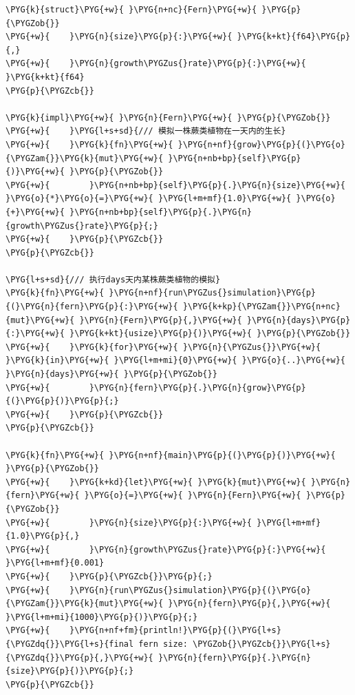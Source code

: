 \begin{Verbatim}[commandchars=\\\{\},breaklines=true,breakanywhere=true,fontsize=\codefont,xleftmargin=17bp]
\PYG{k}{struct}\PYG{+w}{ }\PYG{n+nc}{Fern}\PYG{+w}{ }\PYG{p}{\PYGZob{}}
\PYG{+w}{    }\PYG{n}{size}\PYG{p}{:}\PYG{+w}{ }\PYG{k+kt}{f64}\PYG{p}{,}
\PYG{+w}{    }\PYG{n}{growth\PYGZus{}rate}\PYG{p}{:}\PYG{+w}{ }\PYG{k+kt}{f64}
\PYG{p}{\PYGZcb{}}

\PYG{k}{impl}\PYG{+w}{ }\PYG{n}{Fern}\PYG{+w}{ }\PYG{p}{\PYGZob{}}
\PYG{+w}{    }\PYG{l+s+sd}{/// 模拟一株蕨类植物在一天内的生长}
\PYG{+w}{    }\PYG{k}{fn}\PYG{+w}{ }\PYG{n+nf}{grow}\PYG{p}{(}\PYG{o}{\PYGZam{}}\PYG{k}{mut}\PYG{+w}{ }\PYG{n+nb+bp}{self}\PYG{p}{)}\PYG{+w}{ }\PYG{p}{\PYGZob{}}
\PYG{+w}{        }\PYG{n+nb+bp}{self}\PYG{p}{.}\PYG{n}{size}\PYG{+w}{ }\PYG{o}{*}\PYG{o}{=}\PYG{+w}{ }\PYG{l+m+mf}{1.0}\PYG{+w}{ }\PYG{o}{+}\PYG{+w}{ }\PYG{n+nb+bp}{self}\PYG{p}{.}\PYG{n}{growth\PYGZus{}rate}\PYG{p}{;}
\PYG{+w}{    }\PYG{p}{\PYGZcb{}}
\PYG{p}{\PYGZcb{}}

\PYG{l+s+sd}{/// 执行days天内某株蕨类植物的模拟}
\PYG{k}{fn}\PYG{+w}{ }\PYG{n+nf}{run\PYGZus{}simulation}\PYG{p}{(}\PYG{n}{fern}\PYG{p}{:}\PYG{+w}{ }\PYG{k+kp}{\PYGZam{}}\PYG{n+nc}{mut}\PYG{+w}{ }\PYG{n}{Fern}\PYG{p}{,}\PYG{+w}{ }\PYG{n}{days}\PYG{p}{:}\PYG{+w}{ }\PYG{k+kt}{usize}\PYG{p}{)}\PYG{+w}{ }\PYG{p}{\PYGZob{}}
\PYG{+w}{    }\PYG{k}{for}\PYG{+w}{ }\PYG{n}{\PYGZus{}}\PYG{+w}{ }\PYG{k}{in}\PYG{+w}{ }\PYG{l+m+mi}{0}\PYG{+w}{ }\PYG{o}{..}\PYG{+w}{ }\PYG{n}{days}\PYG{+w}{ }\PYG{p}{\PYGZob{}}
\PYG{+w}{        }\PYG{n}{fern}\PYG{p}{.}\PYG{n}{grow}\PYG{p}{(}\PYG{p}{)}\PYG{p}{;}
\PYG{+w}{    }\PYG{p}{\PYGZcb{}}
\PYG{p}{\PYGZcb{}}

\PYG{k}{fn}\PYG{+w}{ }\PYG{n+nf}{main}\PYG{p}{(}\PYG{p}{)}\PYG{+w}{ }\PYG{p}{\PYGZob{}}
\PYG{+w}{    }\PYG{k+kd}{let}\PYG{+w}{ }\PYG{k}{mut}\PYG{+w}{ }\PYG{n}{fern}\PYG{+w}{ }\PYG{o}{=}\PYG{+w}{ }\PYG{n}{Fern}\PYG{+w}{ }\PYG{p}{\PYGZob{}}
\PYG{+w}{        }\PYG{n}{size}\PYG{p}{:}\PYG{+w}{ }\PYG{l+m+mf}{1.0}\PYG{p}{,}
\PYG{+w}{        }\PYG{n}{growth\PYGZus{}rate}\PYG{p}{:}\PYG{+w}{ }\PYG{l+m+mf}{0.001}
\PYG{+w}{    }\PYG{p}{\PYGZcb{}}\PYG{p}{;}
\PYG{+w}{    }\PYG{n}{run\PYGZus{}simulation}\PYG{p}{(}\PYG{o}{\PYGZam{}}\PYG{k}{mut}\PYG{+w}{ }\PYG{n}{fern}\PYG{p}{,}\PYG{+w}{ }\PYG{l+m+mi}{1000}\PYG{p}{)}\PYG{p}{;}
\PYG{+w}{    }\PYG{n+nf+fm}{println!}\PYG{p}{(}\PYG{l+s}{\PYGZdq{}}\PYG{l+s}{final fern size: \PYGZob{}\PYGZcb{}}\PYG{l+s}{\PYGZdq{}}\PYG{p}{,}\PYG{+w}{ }\PYG{n}{fern}\PYG{p}{.}\PYG{n}{size}\PYG{p}{)}\PYG{p}{;}
\PYG{p}{\PYGZcb{}}
\end{Verbatim}

